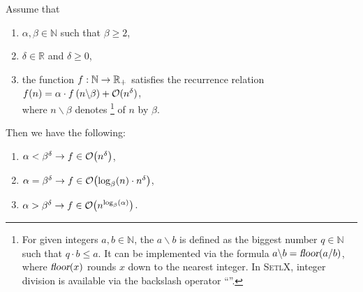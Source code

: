 \begin{Theorem} 
  Assume that 
  \begin{enumerate}
  \item $\alpha,\beta \in \mathbb{N}$ such that  $\beta \geq 2$,
  \item $\delta \in \mathbb{R}$ and $\delta \geq 0$,
  \item the function $f:{\mathbb N} \rightarrow {\mathbb R}_+$ satisfies the recurrence relation
        \\[0.2cm]
        \hspace*{1.3cm}
        $f(n) = \alpha \cdot f\left(n \backslash \beta\right) + \mathcal{O}(n^\delta)$,
        \\[0.2cm]
        where $n \backslash \beta$ denotes \footnote{
          For given integers $a, b \in \mathbb{N}$, the  $a \backslash b$
          is defined as the biggest number $q \in \mathbb{N}$ such that $q \cdot b \leq a$.  It can
          be implemented via the formula $a \backslash b = \textsl{floor}(a/b)$, where
          $\textsl{floor}(x)$ rounds $x$ down to the nearest integer.  In \textsc{SetlX}, integer
          division is available via the backslash operator ``\texttt{}''.
        }  
        of $n$ by $\beta$.
  \end{enumerate}
  Then we have the following:
  \begin{enumerate}
  \item $\alpha < \beta^\delta\rightarrow f \in \mathcal{O}\bigl(n^{\delta}\bigr)$,
  \item $\alpha = \beta^\delta\rightarrow f \in \mathcal{O}\bigl(\log_\beta(n) \cdot n^{\delta}\bigr)$,
  \item $\alpha > \beta^{\delta} \rightarrow f \in \mathcal{O}\bigl(n^{\log_{\beta}(\alpha)}\bigr)$. 
  \end{enumerate}
\end{Theorem}

